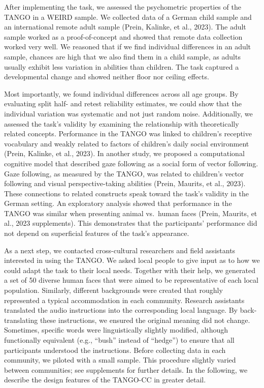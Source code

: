 \documentclass[
  man,mask,floatsintext]{apa7}
\begin{document}
After implementing the task, we assessed the psychometric properties of the TANGO in a WEIRD sample. We collected data of a German child sample and an international remote adult sample (Prein, Kalinke, et al., 2023). The adult sample worked as a proof-of-concept and showed that remote data collection worked very well. We reasoned that if we find individual differences in an adult sample, chances are high that we also find them in a child sample, as adults usually exhibit less variation in abilities than children. The task captured a developmental change and showed neither floor nor ceiling effects.

Most importantly, we found individual differences across all age groups. By evaluating split half- and retest reliability estimates, we could show that the individual variation was systematic and not just random noise. Additionally, we assessed the task's validity by examining the relationship with theoretically related concepts. Performance in the TANGO was linked to children's receptive vocabulary and weakly related to factors of children's daily social environment (Prein, Kalinke, et al., 2023). In another study, we proposed a computational cognitive model that described gaze following as a social form of vector following. Gaze following, as measured by the TANGO, was related to children's vector following and visual perspective-taking abilities (Prein, Maurits, et al., 2023). These connections to related constructs speak toward the task's validity in the German setting. An exploratory analysis showed that performance in the TANGO was similar when presenting animal vs.~human faces (Prein, Maurits, et al., 2023 supplements). This demonstrates that the participants' performance did not depend on superficial features of the task's appearance.

As a next step, we contacted cross-cultural researchers and field assistants interested in using the TANGO. We asked local people to give input as to how we could adapt the task to their local needs. Together with their help, we generated a set of 50 diverse human faces that were aimed to be representative of each local population. Similarly, different backgrounds were created that roughly represented a typical accommodation in each community. Research assistants translated the audio instructions into the corresponding local language. By back-translating these instructions, we ensured the original meaning did not change. Sometimes, specific words were linguistically slightly modified, although functionally equivalent (e.g., ``bush'' instead of ``hedge'') to ensure that all participants understood the instructions. Before collecting data in each community, we piloted with a small sample. This procedure slightly varied between communities; see supplements for further details. In the following, we describe the design features of the TANGO-CC in greater detail.
\end{document}
